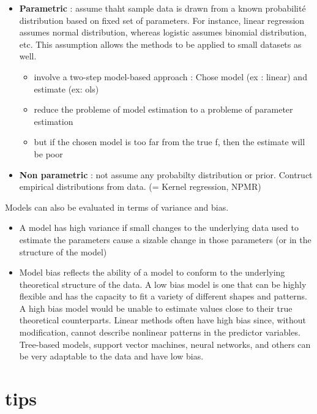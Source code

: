 \documentclass[]{book}
\providecommand{\tightlist}{%
  \setlength{\itemsep}{0pt}\setlength{\parskip}{0pt}}
\theoremstyle{definition}
\theoremstyle{definition}
\theoremstyle{definition}
\theoremstyle{remark}
\begin{document}
\begin{itemize}
\tightlist
\item
  \textbf{Parametric} : assume thaht sample data is drawn from a known
  probabilité distribution based on fixed set of parameters. For
  instance, linear regression assumes normal distribution, whereas
  logistic assumes binomial distribution, etc. This assumption allows
  the methods to be applied to small datasets as well.

  \begin{itemize}
  \tightlist
  \item
    involve a two-step model-based approach : Chose model (ex : linear)
    and estimate (ex: ols)
  \item
    reduce the probleme of model estimation to a probleme of parameter
    estimation
  \item
    but if the chosen model is too far from the true f, then the
    estimate will be poor
  \end{itemize}
\item
  \textbf{Non parametric} : not assume any probabilty distribution or
  prior. Contruct empirical distributions from data. (= Kernel
  regression, NPMR)
\end{itemize}

Models can also be evaluated in terms of variance and bias.

\begin{itemize}
\tightlist
\item
  A model has high variance if small changes to the underlying data used
  to estimate the parameters cause a sizable change in those parameters
  (or in the structure of the model)
\item
  Model bias reflects the ability of a model to conform to the
  underlying theoretical structure of the data. A low bias model is one
  that can be highly flexible and has the capacity to fit a variety of
  different shapes and patterns. A high bias model would be unable to
  estimate values close to their true theoretical counterparts. Linear
  methods often have high bias since, without modification, cannot
  describe nonlinear patterns in the predictor variables. Tree-based
  models, support vector machines, neural networks, and others can be
  very adaptable to the data and have low bias.
\end{itemize}

\section{tips}\label{tips}
\end{document}
